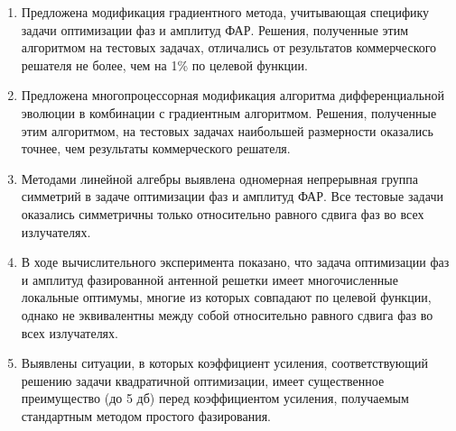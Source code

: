 \begin{enumerate}
\item Предложена модификация градиентного метода, учитывающая специфику задачи оптимизации фаз и амплитуд ФАР. 
Решения, полученные этим алгоритмом на тестовых задачах, отличались от результатов коммерческого решателя не более, чем на 1\% по целевой функции.
\item Предложена многопроцессорная модификация алгоритма дифференциальной эволюции в комбинации с градиентным алгоритмом. Решения, полученные этим алгоритмом, на тестовых задачах наибольшей размерности оказались точнее, чем результаты коммерческого решателя.   
  \item Методами линейной алгебры выявлена одномерная непрерывная группа симметрий в задаче оптимизации фаз и амплитуд ФАР. Все тестовые задачи оказались симметричны только относительно равного сдвига фаз во всех излучателях.
  \item В ходе вычислительного эксперимента показано, что задача оптимизации фаз и амплитуд фазированной антенной решетки имеет многочисленные локальные оптимумы, многие из которых совпадают по целевой функции, однако не эквивалентны между собой относительно равного сдвига фаз во всех излучателях.
  \item Выявлены ситуации, в которых коэффициент усиления, соответствующий решению задачи квадратичной оптимизации, имеет существенное преимущество (до 5 дб) перед коэффициентом усиления, получаемым стандартным методом простого фазирования. 
\end{enumerate}
